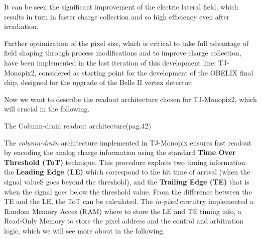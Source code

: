 It can be seen the significant improvement of the electric lateral field, which results in turn in faster charge collection and so high efficiency even after irradiation. 

\begin{comment}
The reason was address to the weak lateral field at the pixel edge, so the process has been further optimized in order to resolve this issue and another chip, called mini-Malta, was implemented with this variation to test its efficiency. Results show significant improvement, thus it was implemented in the original TJ-Monopix1 and TJ-Malta1 chips.
The variation consist in two different structure of the pixel, displayed in~\autoref{fig:enhance_lat} called \textbf{Full deep p-well (FDPW)} and \textbf{Removed deep p-well (RDPW)}. As we can see, the deep p-well underneath the CMOS electronics is reduced at the pixel edge in case of RDPW structure.
\end{comment} 






Further optimization of the pixel size, which is critical to take full advantage of field shaping through process modifications and to improve charge collection, have been implemented in the last iteration of this development line: TJ-Monopix2, considered as starting point for the development of the OBELIX final chip, designed for the upgrade of the Belle II vertex detector.  


Now we want to describe the readout architecture chosen for TJ-Monopix2, which will crucial in the following. 

\begin{description}
\item[The Column-drain readout architecture(pag.42)]
\end{description}

The \textit{column-drain} architecture implemented in TJ-Monopix ensures fast readout by encoding the analog charge information using the standard \textbf{Time Over Threshold (ToT)} technique. This procedure exploits two timing information: the \textbf{Leading Edge (LE)} which correspond to the hit time of arrival (when the signal valueS goes beyond the threshold), and the \textbf{Trailing Edge (TE)} that is when the signal goes below the threshold value. From the difference between the TE and the LE, the ToT can be calculated. 
The \textit{in-pixel} circuitry implemented a Random Memory Acces (RAM) where to store the LE and TE timing info, a Read-Only Memory to store the pixel address and the control and arbitration logic, which we will see more about in the following.
 
